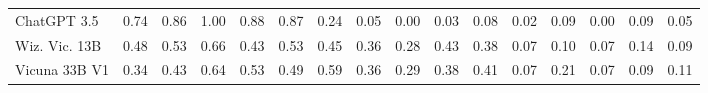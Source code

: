 \begin{table}[!htbp]
\begin{tabular}{l|rrrr|r|rrrr|r|rrrr|r}
ChatGPT 3.5 & {\cellcolor[HTML]{30954F}} \color[HTML]{F1F1F1} 0.74 & {\cellcolor[HTML]{0A703A}} \color[HTML]{F1F1F1} 0.86 & {\cellcolor[HTML]{004529}} \color[HTML]{F1F1F1} 1.00 & {\cellcolor[HTML]{056C39}} \color[HTML]{F1F1F1} 0.88 & {\cellcolor[HTML]{086E3A}} \color[HTML]{F1F1F1} 0.87 & {\cellcolor[HTML]{FEBA55}} \color[HTML]{000000} 0.24 & {\cellcolor[HTML]{FFF4B2}} \color[HTML]{000000} 0.05 & {\cellcolor[HTML]{FFFFCC}} \color[HTML]{000000} 0.00 & {\cellcolor[HTML]{FFF8BB}} \color[HTML]{000000} 0.03 & {\cellcolor[HTML]{FFEEA3}} \color[HTML]{000000} 0.08 & {\cellcolor[HTML]{FFFACA}} \color[HTML]{000000} 0.02 & {\cellcolor[HTML]{FEB643}} \color[HTML]{000000} 0.09 & {\cellcolor[HTML]{FFFFE5}} \color[HTML]{000000} 0.00 & {\cellcolor[HTML]{FEB643}} \color[HTML]{000000} 0.09 & {\cellcolor[HTML]{FEE799}} \color[HTML]{000000} 0.05 \\
Wiz. Vic. 13B & {\cellcolor[HTML]{A7DB8C}} \color[HTML]{000000} 0.48 & {\cellcolor[HTML]{8ED082}} \color[HTML]{000000} 0.53 & {\cellcolor[HTML]{4FB264}} \color[HTML]{F1F1F1} 0.66 & {\cellcolor[HTML]{BEE596}} \color[HTML]{000000} 0.43 & {\cellcolor[HTML]{92D183}} \color[HTML]{000000} 0.53 & {\cellcolor[HTML]{F74327}} \color[HTML]{F1F1F1} 0.45 & {\cellcolor[HTML]{FD8038}} \color[HTML]{F1F1F1} 0.36 & {\cellcolor[HTML]{FEAB49}} \color[HTML]{000000} 0.28 & {\cellcolor[HTML]{FC4F2A}} \color[HTML]{F1F1F1} 0.43 & {\cellcolor[HTML]{FD7435}} \color[HTML]{F1F1F1} 0.38 & {\cellcolor[HTML]{FECE65}} \color[HTML]{000000} 0.07 & {\cellcolor[HTML]{FE9829}} \color[HTML]{000000} 0.10 & {\cellcolor[HTML]{FECE65}} \color[HTML]{000000} 0.07 & {\cellcolor[HTML]{E1640E}} \color[HTML]{F1F1F1} 0.14 & {\cellcolor[HTML]{FEA736}} \color[HTML]{000000} 0.09 \\
Vicuna 33B V1 & {\cellcolor[HTML]{DFF3A8}} \color[HTML]{000000} 0.34 & {\cellcolor[HTML]{BEE596}} \color[HTML]{000000} 0.43 & {\cellcolor[HTML]{58B669}} \color[HTML]{F1F1F1} 0.64 & {\cellcolor[HTML]{8ED082}} \color[HTML]{000000} 0.53 & {\cellcolor[HTML]{A6DA8B}} \color[HTML]{000000} 0.49 & {\cellcolor[HTML]{C40524}} \color[HTML]{F1F1F1} 0.59 & {\cellcolor[HTML]{FD8038}} \color[HTML]{F1F1F1} 0.36 & {\cellcolor[HTML]{FEA446}} \color[HTML]{000000} 0.29 & {\cellcolor[HTML]{FD7435}} \color[HTML]{F1F1F1} 0.38 & {\cellcolor[HTML]{FC612F}} \color[HTML]{F1F1F1} 0.41 & {\cellcolor[HTML]{FECE65}} \color[HTML]{000000} 0.07 & {\cellcolor[HTML]{662506}} \color[HTML]{F1F1F1} 0.21 & {\cellcolor[HTML]{FECE65}} \color[HTML]{000000} 0.07 & {\cellcolor[HTML]{FEB643}} \color[HTML]{000000} 0.09 & {\cellcolor[HTML]{FB9225}} \color[HTML]{000000} 0.11 \\

\end{tabular}
\end{table}
